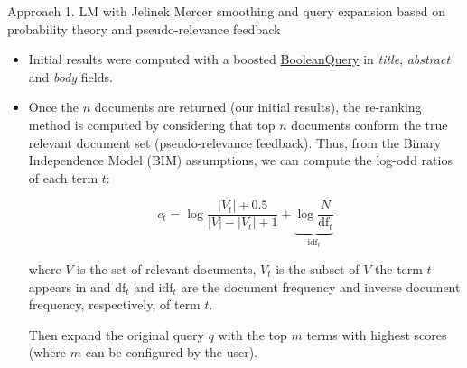 \documentclass[10pt]{beamer}
\begin{document}
{
\begin{frame}{Approach 1. LM with Jelinek Mercer smoothing and query expansion based on probability theory and pseudo-relevance feedback}
    \begin{itemize}
        \item Initial results were computed with a boosted \href{https://lucene.apache.org/core/8_9_0/core/org/apache/lucene/search/BooleanQuery.html}{BooleanQuery} in \textit{title}, \textit{abstract} and \textit{body} fields.
        \item Once the $n$ documents are returned (our initial results), the re-ranking method is computed by considering that top $n$ documents conform the true relevant document set (pseudo-relevance feedback). Thus, from the Binary Independence Model (BIM) assumptions, we can compute the log-odd ratios of each term $t$:
        
        \[ c_t = \log \frac{|V_t| + 0.5}{|V| - |V_t| +1 } + \underbrace{\log \frac{N}{\text{df}_t}}_{\text{idf}_t} \] 

        where $V$ is the set of relevant documents, $V_t$ is the subset of $V$ the term $t$ appears in and  $\text{df}_t$ and $\text{idf}_t$ are the document frequency and inverse document frequency, respectively, of term $t$.
        
        Then expand the original query $q$ with the top $m$ terms with highest scores  (where $m$ can be configured by the user).
    \end{itemize}
\end{frame}

}
\end{document}
